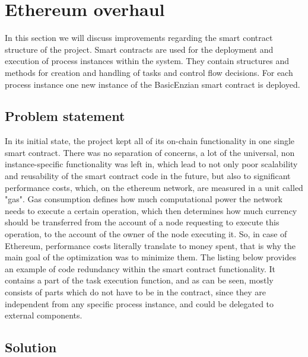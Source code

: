 %
\section{Ethereum overhaul}
\label{sec:impr:eth}

In this section we will discuss improvements regarding the smart contract structure of the project. Smart contracts are used for the deployment and execution of process instances within the system. They contain structures and methods for creation and handling of tasks and control flow decisions. For each process instance one new instance of the BasicEnzian smart contract is deployed.

\subsection{Problem statement}
\label{sec:impr:eth:problem}

In its initial state, the project kept all of its on-chain functionality in one single smart contract. There was no separation of concerns, a lot of the universal, non instance-specific functionality was left in, which lead to not only poor scalability and reusability of the smart contract code in the future, but also to significant performance costs, which, on the ethereum network, are measured in a unit called "gas". Gas consumption defines how much computational power the network needs to execute a certain operation, which then determines how much currency should be transferred from the account of a node requesting to execute this operation, to the account of the owner of the node executing it. So, in case of Ethereum, performance costs literally translate to money spent, that is why the main goal of the optimization was to minimize them. The listing below provides an example of code redundancy within the smart contract functionality. It contains a part of the task execution function, and as can be seen, mostly consists of parts which do not have to be in the contract, since they are independent from any specific process instance, and could be delegated to external components.

 

\subsection{Solution}
\label{sec:impr:eth:solution}

